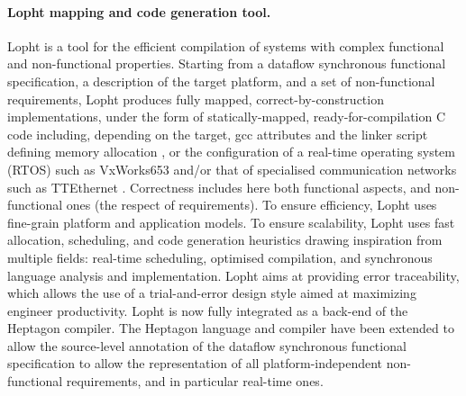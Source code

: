 \documentclass[a4paper,11pt]{article}
\begin{document}
\paragraph{\INRIA{} Lopht mapping and code generation tool.}
Lopht \cite{lopht1,lopht2,lopht3,erts2,dasia} is a tool for the
efficient compilation of systems with complex functional and
non-functional properties. Starting from a dataflow synchronous
functional specification, a description of the target platform, and a
set of non-functional requirements, Lopht produces fully mapped,
correct-by-construction implementations, under the form of
statically-mapped, ready-for-compilation C code including, depending
on the target, gcc attributes and the linker script defining memory
allocation \cite{lopht3}, or the configuration of a real-time
operating system (RTOS) such as VxWorks653 and/or that of specialised
communication networks such as TTEthernet
\cite{dasia,lopht1}. Correctness includes here both functional
aspects, and non-functional ones (the respect of requirements).  To
ensure efficiency, Lopht uses fine-grain platform and application
models. To ensure scalability, Lopht uses fast allocation, scheduling,
and code generation heuristics drawing inspiration from multiple
fields: real-time scheduling, optimised compilation, and synchronous
language analysis and implementation. Lopht aims at providing error
traceability, which allows the use of a trial-and-error design style
aimed at maximizing engineer productivity.
%
Lopht is now fully integrated as a back-end of the Heptagon
compiler. The Heptagon language and compiler have been extended to
allow the source-level annotation of the dataflow synchronous
functional specification to allow the representation of all
platform-independent non-functional requirements, and in particular
real-time ones.
\end{document}
